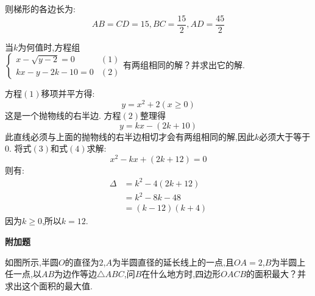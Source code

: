 \begin{questions}
\begin{solution}
		则梯形的各边长为:
		\begin{equation*}
			AB = CD = 15, BC = \frac{15}{2}, AD = \frac{45}{2}
		\end{equation*}
	\end{solution}

	\question[10] 当$k$为何值时,方程组 \begin{math}
		\left\{
		\begin{array}{lr}
			x - \sqrt{y - 2} = 0 & (1) \\
			kx - y - 2k - 10 = 0 & (2)
		\end{array}
		\right. 有两组相同的解？并求出它的解.
	\end{math}

	\begin{solution}
		方程$(1)$移项并平方得:
		\begin{equation*}
			y=x^2 + 2 (x \geqslant 0) \tag{3}
		\end{equation*}
		这是一个抛物线的右半边.
		方程$(2)$整理得
		\begin{equation*}
			y=kx - (2k + 10) \tag{4}
		\end{equation*}
		此直线必须与上面的抛物线的右半边相切才会有两组相同的解,因此$k$必须大于等于0.
		将式$(3)$和式$(4)$求解:
		\begin{equation*}
			x^2 - kx + (2k + 12) = 0
		\end{equation*}
		则有:
		\begin{align*}
			\Delta & = k^2 - 4(2k + 12) \\
			       & = k^2 - 8k - 48    \\
			       & = (k-12)(k+4)
		\end{align*}
		因为$k\geqslant 0$,所以$k=12$.
	\end{solution}

	\begin{center}
		\textbf{附加题}
	\end{center}

	\question
	如图所示,半圆$O$的直径为$2$,$A$为半圆直径的延长线上的一点,且$OA=2$,$B$为半圆上任一点,以$AB$为边作等边$\triangle{ABC}$,问$B$在什么地方时,四边形$OACB$的面积最大？并求出这个面积的最大值.
	\begin{figure*}[ht]
		\centering
\end{figure*}
\end{questions}
